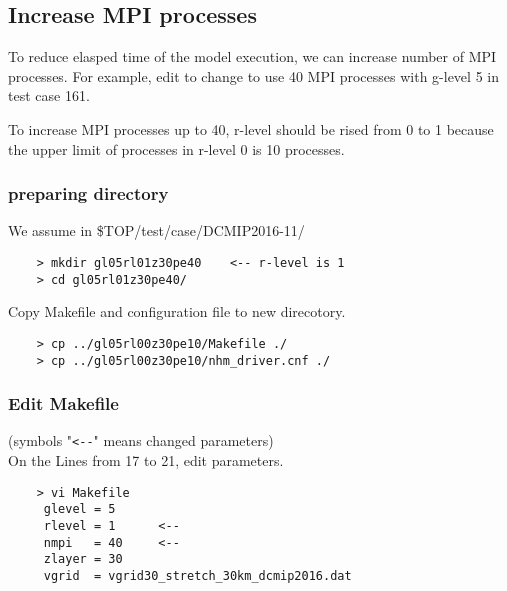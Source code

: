\documentclass[a4paper]{article}
\begin{document}
\subsection{Increase MPI processes}
 \noindent To reduce elasped time of the model execution, we can increase
 number of MPI processes. For example, edit to change to use 40 MPI processes
 with g-level 5 in test case 161.

 To increase MPI processes up to 40, r-level should be rised from 0 to 1
 because the upper limit of processes in r-level 0 is 10 processes.

\subsubsection{preparing directory}
 We assume in \${TOP}/test/case/DCMIP2016-11/
 \begin{verbatim}
    > mkdir gl05rl01z30pe40    <-- r-level is 1
    > cd gl05rl01z30pe40/
 \end{verbatim}

 \noindent Copy Makefile and configuration file to new direcotory.
 \begin{verbatim}
    > cp ../gl05rl00z30pe10/Makefile ./
    > cp ../gl05rl00z30pe10/nhm_driver.cnf ./
 \end{verbatim}

\subsubsection{Edit Makefile}
 (symbols "\verb|<--|" means changed parameters) \\
 On the Lines from 17 to 21, edit parameters.
 \begin{verbatim}
    > vi Makefile
     glevel = 5
     rlevel = 1      <--
     nmpi   = 40     <--
     zlayer = 30
     vgrid  = vgrid30_stretch_30km_dcmip2016.dat
 \end{verbatim}
\end{document}
